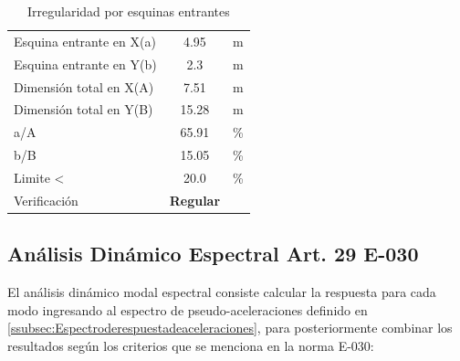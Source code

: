 \documentclass{article}%
\begin{document}
%


\begin{table}[H]%
\centering%
\caption{Irregularidad por esquinas entrantes}%
\begin{tabular}{|ll|c|r}%
\cline{1-3}%
\multicolumn{2}{|l|}{Esquina entrante en X(a)} & 4.95 & \multicolumn{1}{l}{m} \\%
\cline{1-3}%
\multicolumn{2}{|l|}{Esquina entrante en Y(b)} & 2.3 & \multicolumn{1}{l}{m} \\%
\cline{1-3}%
\multicolumn{2}{|l|}{Dimensión total en X(A)} & 7.51 & \multicolumn{1}{l}{m} \\%
\cline{1-3}%
\multicolumn{2}{|l|}{Dimensión total en Y(B)} & 15.28 & \multicolumn{1}{l}{m} \\%
\cline{1-3}%
\multicolumn{2}{|l|}{a/A} & 65.91 & \multicolumn{1}{l}{\%} \\%
\cline{1-3}%
\multicolumn{2}{|l|}{b/B} & 15.05 & \multicolumn{1}{l}{\%} \\%
\cline{1-3}%
\multicolumn{2}{|l|}{Limite <} & 20.0 & \multicolumn{1}{l}{\%} \\%
\cline{1-3}%
\multicolumn{2}{|l|}{Verificación} & \textcolor[rgb]{ .267,  .447,  .769}{\textbf{Regular}} & \multicolumn{1}{l}{} \\%
\cline{1-3}%
\end{tabular}%
\end{table}

%
\subsection{Análisis Dinámico Espectral Art. 29 E{-}030}%
\label{subsec:AnlisisDinmicoEspectralArt.29E{-}030}%
El análisis dinámico modal espectral consiste calcular la respuesta para cada modo ingresando al espectro de pseudo-aceleraciones definido en \ref{ssubsec:Espectroderespuestadeaceleraciones}, para posteriormente combinar los resultados según los criterios que se menciona en la norma E-030:\\%

%
\end{document}
